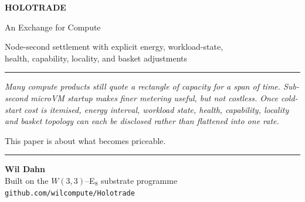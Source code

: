 \documentclass[11pt,letterpaper]{article}
\newcommand{\W}{\ensuremath{W(3,3)}}
\begin{document}
\thispagestyle{empty}
\begin{center}
\vspace*{0.2cm}


\vspace{0.35cm}
{\color{navy}\fontsize{40}{44}\selectfont\bfseries HOLOTRADE}

\vspace{0.28cm}
{\color{cyan}\Large An Exchange for Compute}

\vspace{0.15cm}
{\color{grey}\large Node-second settlement with explicit energy, workload-state,\\ health, capability, locality, and basket adjustments}

\vspace{1.0cm}
{\color{rule}\rule{0.55\textwidth}{0.7pt}}
\vspace{0.7cm}

\begin{minipage}{0.86\textwidth}
\centering\itshape\color{ink}
Many compute products still quote a rectangle of capacity for a span of time.
Sub-second microVM startup makes finer metering useful, but not costless. Once
cold-start cost is itemised, energy interval, workload state, health, capability,
locality and basket topology can each be disclosed rather than flattened into
one rate.

\vspace{5pt}
This paper is about what becomes priceable.
\end{minipage}

\vspace{1.1cm}
{\color{rule}\rule{0.55\textwidth}{0.7pt}}

\vspace{0.9cm}
{\large\bfseries Wil Dahn}\\[2pt]
{\color{grey}\normalsize Built on the \W--E$_8$ substrate programme}\\[3pt]
{\color{grey}\small\texttt{github.com/wilcompute/Holotrade}}


\end{center}
\end{document}

